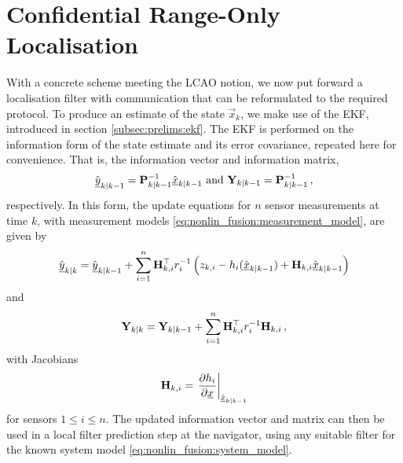 \section{Confidential Range-Only Localisation}\label{sec:nonlin_fusion:conf_range_only_localisation}
With a concrete scheme meeting the LCAO notion, we now put forward a localisation filter with communication that can be reformulated to the required protocol. To produce an estimate of the state $\vec{x}_k$, we make use of the EKF, introduced in section \ref{subsec:prelims:ekf}. The EKF is performed on the information form of the state estimate and its error covariance, repeated here for convenience. That is, the information vector and information matrix,
\begin{equation}
    \hat{{\underline{y}}}_{k|k-1} = {{\mathbf{P}}}_{k|k-1}^{-1}\hat{{\underline{x}}}_{k|k-1} \text{ and } {\ensuremath{{\mathbf{Y}}}}_{k|k-1} = {{\mathbf{P}}}_{k|k-1}^{-1}\,,
\end{equation}
respectively. In this form, the update equations for $n$ sensor measurements at time $k$, with measurement models \eqref{eq:nonlin_fusion:measurement_model}, are given by
\begin{equation}\label{eq:nonlin_fusion:eif_info_vec_update}
        \hat{{\underline{y}}}_{k|k} = \hat{{\underline{y}}}_{k|k-1} +  \sum^n_{i=1}{{\mathbf{H}}}^\top_{k,i} r^{-1}_i \left(z_{k,i} - h_i(\hat{{\underline{x}}}_{k|k-1}) + {{\mathbf{H}}}_{k,i}\hat{{\underline{x}}}_{k|k-1}\right)
\end{equation}
and
\begin{equation}\label{eq:nonlin_fusion:eif_info_mat_update}
    {\ensuremath{{\mathbf{Y}}}}_{k|k} = {{\mathbf{Y}}}_{k|k-1} + \sum^n_{i=1}{{\mathbf{H}}}^\top_{k,i} r^{-1}_i {{\mathbf{H}}}_{k,i}\,,
\end{equation}
with Jacobians
\begin{equation}\label{eq:nonlin_fusion:measurement_jacobian}
    {\ensuremath{{\mathbf{H}}}}_{k,i} = \left.\frac{\partial h_i}{\partial {\underline{x}}}\right|_{\hat{{\underline{x}}}_{k|k-1}}
\end{equation}
for sensors $1\leq i\leq n$. The updated information vector and matrix can then be used in a local filter prediction step at the navigator, using any suitable filter for the known system model \eqref{eq:nonlin_fusion:system_model}.

